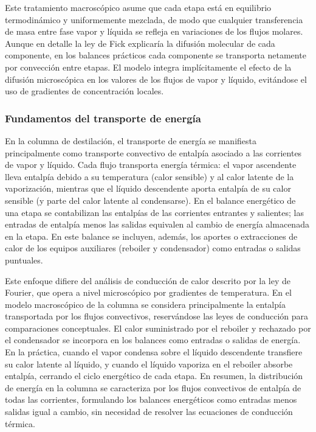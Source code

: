 Este tratamiento macroscópico asume que cada etapa está en equilibrio termodinámico y uniformemente mezclada, de modo que cualquier transferencia de masa entre fase vapor y líquida se refleja en variaciones de los flujos molares. Aunque en detalle la ley de Fick explicaría la difusión molecular de cada componente, en los balances prácticos cada componente se transporta netamente por convección entre etapas. El modelo integra implícitamente el efecto de la difusión microscópica en los valores de los flujos de vapor y líquido, evitándose el uso de gradientes de concentración locales.

\subsubsection{Fundamentos del transporte de energía}
En la columna de destilación, el transporte de energía se manifiesta principalmente como transporte convectivo de entalpía asociado a las corrientes de vapor y líquido. Cada flujo transporta energía térmica: el vapor ascendente lleva entalpía debido a su temperatura (calor sensible) y al calor latente de la vaporización, mientras que el líquido descendente aporta entalpía de su calor sensible (y parte del calor latente al condensarse). En el balance energético de una etapa se contabilizan las entalpías de las corrientes entrantes y salientes; las entradas de entalpía menos las salidas equivalen al cambio de energía almacenada en la etapa. En este balance se incluyen, además, los aportes o extracciones de calor de los equipos auxiliares (reboiler y condensador) como entradas o salidas puntuales.

Este enfoque difiere del análisis de conducción de calor descrito por la ley de Fourier, que opera a nivel microscópico por gradientes de temperatura. En el modelo macroscópico de la columna se considera principalmente la entalpía transportada por los flujos convectivos, reservándose las leyes de conducción para comparaciones conceptuales. El calor suministrado por el reboiler y rechazado por el condensador se incorpora en los balances como entradas o salidas de energía. En la práctica, cuando el vapor condensa sobre el líquido descendente transfiere su calor latente al líquido, y cuando el líquido vaporiza en el reboiler absorbe entalpía, cerrando el ciclo energético de cada etapa. En resumen, la distribución de energía en la columna se caracteriza por los flujos convectivos de entalpía de todas las corrientes, formulando los balances energéticos como entradas menos salidas igual a cambio, sin necesidad de resolver las ecuaciones de conducción térmica.


